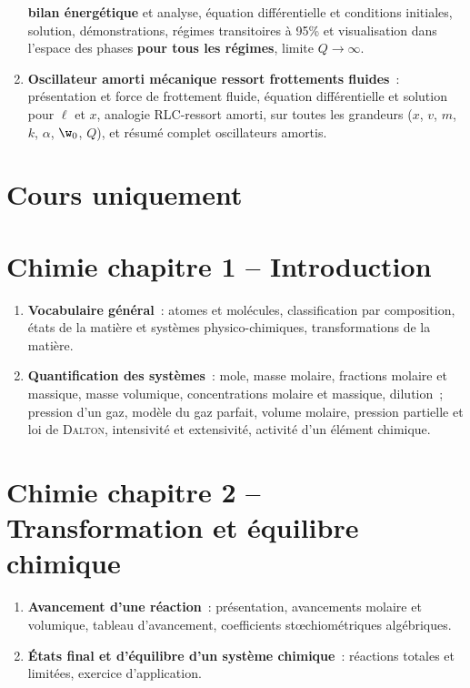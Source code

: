 \documentclass[a4paper, 12pt, final, garamond]{book}
\begin{document}
\begin{enumerate}[label=\Roman*]
        \textbf{bilan énergétique} et analyse, équation différentielle et
        conditions initiales, solution, démonstrations, régimes transitoires à
        95\% et visualisation dans l'espace des phases \textbf{pour tous les
        régimes}, limite $Q \rightarrow \infty$.
    \item \textbf{Oscillateur amorti mécanique ressort frottements fluides}~:
        présentation et force de frottement fluide, équation différentielle et
        solution pour $\ell$ et $x$, analogie RLC-ressort amorti, sur toutes les
        grandeurs ($x$, $v$, $m$, $k$, $\alpha$, $\w_0$, $Q$), et résumé complet
        oscillateurs amortis.
\end{enumerate}


\section{Cours uniquement}
\section*{Chimie chapitre 1 -- Introduction}
\begin{enumerate}[label=\Roman*]
    \item \textbf{Vocabulaire général}~: atomes et molécules, classification par
        composition, états de la matière et systèmes physico-chimiques,
        transformations de la matière.
    \item \textbf{Quantification des systèmes}~: mole, masse molaire, fractions
        molaire et massique, masse volumique, concentrations molaire et
        massique, dilution~; pression d'un gaz, modèle du gaz parfait, volume
        molaire, pression partielle et loi de \textsc{Dalton}, intensivité et
        extensivité, activité d'un élément chimique.
\end{enumerate}

\section*{Chimie chapitre 2 -- Transformation et équilibre chimique}
\begin{enumerate}[label=\Roman*]
    \item \textbf{Avancement d'une réaction}~: présentation, avancements molaire
        et volumique, tableau d'avancement, coefficients stœchiométriques
        algébriques.
    \item \textbf{États final et d'équilibre d'un système chimique}~: réactions
        totales et limitées, exercice d'application.
\end{enumerate}
\end{document}
